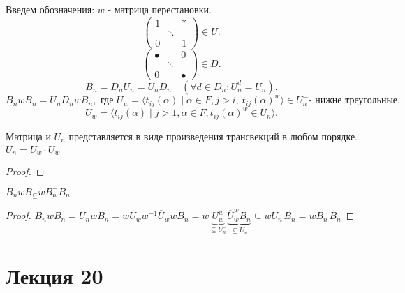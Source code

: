 \documentclass[12pt]{report}
\begin{document}
Введем обозначения:
    $w$ - матрица перестановки.
    \[
    \left ( 
    \begin{array}{ccc}
	1 & & * \\
	  & \ddots & \\
	0 & & 1
    \end{array}
    \right ) \in  U
    .\] 
    \[
    \left ( 
    \begin{array}{ccc}
	\bullet & & 0 \\
	  & \ddots & \\
	0 & & \bullet
    \end{array}
    \right ) \in  D
    .\] 
    \[
	B_n = D_n U_n = U_n D_n \quad (\forall d \in  D_n: U_n ^ d = U_n)
    .\] 
    \[
	B_nwB_n = U_nD_n w B_n, \mbox{ где }U_w = \langle t_{ij} (\alpha ) \mid \alpha  \in  F, j > i, ~ t_{ij} (\alpha )^w \rangle \in  U^{-}_n \mbox{- нижне треугольные}
    .\] 
    \[
	U_w = \langle t_{ij} (\alpha )\mid j > 1 , \alpha \in F, t_{ij} (\alpha  )^w \in  U_n \rangle
    .\] 
\begin{cor}
	Матрица и $U_n$ представляется     в виде произведения трансвекций в любом порядке. $U_n = U_w \cdot \overline{U}_w$  %
\end{cor}
\begin{proof}
\end{proof}
\begin{cor}
    $B_nwB_ \subseteq w B_n^{-} B_n$
\end{cor}
\begin{proof}
    $
    B_n w B_n = U_n w B_n = w U_w w^{-1} \overline{U}_w w B_n = w \underbrace {U_w^w}_{\subseteq U_n^{-}} \underbrace{\overline{U}_w^w B_n}_{\subseteq U_n} \subseteq w U_n^{-} B_n = w B_n^{-} B_n
	    $
\end{proof}
\section{Лекция 20}
\end{document}
